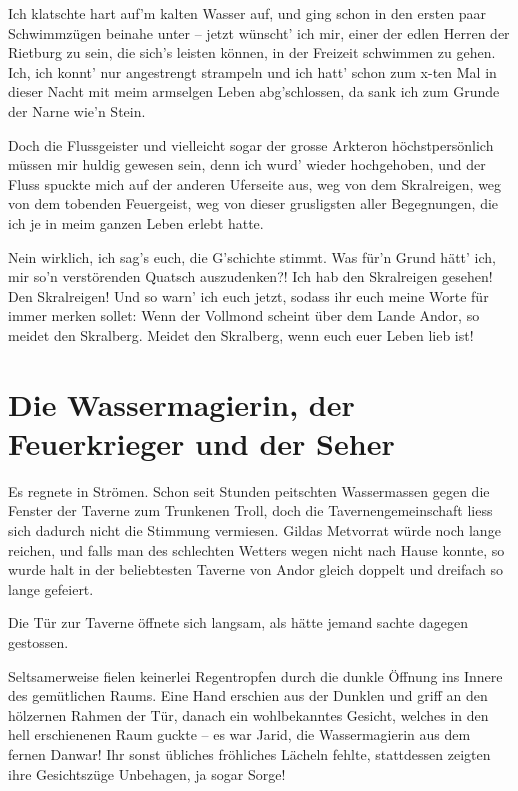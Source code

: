\documentclass[10pt, a4paper, oneside]{book}
\begin{document}
Ich klatschte hart auf’m kalten Wasser auf, und ging schon in den ersten paar Schwimmzügen beinahe unter – jetzt wünscht’ ich mir, einer der edlen Herren der Rietburg zu sein, die sich’s leisten können, in der Freizeit schwimmen zu gehen. Ich, ich konnt’ nur angestrengt strampeln und ich hatt’ schon zum x-ten Mal in dieser Nacht mit meim armselgen Leben abg’schlossen, da sank ich zum Grunde der Narne wie’n Stein.

Doch die Flussgeister und vielleicht sogar der grosse Arkteron höchstpersönlich müssen mir huldig gewesen sein, denn ich wurd’ wieder hochgehoben, und der Fluss spuckte mich auf der anderen Uferseite aus, weg von dem Skralreigen, weg von dem tobenden Feuergeist, weg von dieser grusligsten aller Begegnungen, die ich je in meim ganzen Leben erlebt hatte.

Nein wirklich, ich sag’s euch, die G’schichte stimmt. Was für’n Grund hätt’ ich, mir so’n verstörenden Quatsch auszudenken?! Ich hab den Skralreigen gesehen! Den Skralreigen! Und so warn’ ich euch jetzt, sodass ihr euch meine Worte für immer merken sollet: Wenn der Vollmond scheint über dem Lande Andor, so meidet den Skralberg. Meidet den Skralberg, wenn euch euer Leben lieb ist!






\newpage
\section{Die Wassermagierin, der Feuerkrieger und der Seher}



Es regnete in Strömen. Schon seit Stunden peitschten Wassermassen gegen die Fenster der Taverne zum Trunkenen Troll, doch die Tavernengemeinschaft liess sich dadurch nicht die Stimmung vermiesen. Gildas Metvorrat würde noch lange reichen, und falls man des schlechten Wetters wegen nicht nach Hause konnte, so wurde halt in der beliebtesten Taverne von Andor gleich doppelt und dreifach so lange gefeiert.

Die Tür zur Taverne öffnete sich langsam, als hätte jemand sachte dagegen gestossen.

Seltsamerweise fielen keinerlei Regentropfen durch die dunkle Öffnung ins Innere des gemütlichen Raums. Eine Hand erschien aus der Dunklen und griff an den hölzernen Rahmen der Tür, danach ein wohlbekanntes Gesicht, welches in den hell erschienenen Raum guckte – es war Jarid, die Wassermagierin aus dem fernen Danwar! Ihr sonst übliches fröhliches Lächeln fehlte, stattdessen zeigten ihre Gesichtszüge Unbehagen, ja sogar Sorge!
\end{document}
